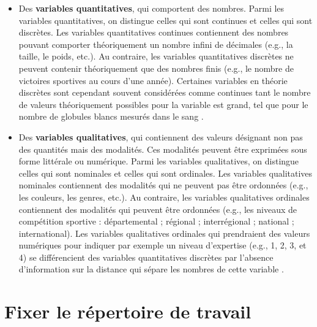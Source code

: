 \documentclass[
  french,
]{book}
\providecommand{\tightlist}{%
  \setlength{\itemsep}{0pt}\setlength{\parskip}{0pt}}
\begin{document}
\begin{itemize}
\tightlist
\item
  Des \textbf{variables quantitatives}, qui comportent des nombres. Parmi les variables quantitatives, on distingue celles qui sont continues et celles qui sont discrètes. Les variables quantitatives continues contiennent des nombres pouvant comporter théoriquement un nombre infini de décimales (e.g., la taille, le poids, etc.). Au contraire, les variables quantitatives discrètes ne peuvent contenir théoriquement que des nombres finis (e.g., le nombre de victoires sportives au cours d'une année). Certaines variables en théorie discrètes sont cependant souvent considérées comme continues tant le nombre de valeurs théoriquement possibles pour la variable est grand, tel que pour le nombre de globules blancs mesurés dans le sang \autocite{labreucheDifferentsTypesVariables2010}.
\item
  Des \textbf{variables qualitatives}, qui contiennent des valeurs désignant non pas des quantités mais des modalités. Ces modalités peuvent être exprimées sous forme littérale ou numérique. Parmi les variables qualitatives, on distingue celles qui sont nominales et celles qui sont ordinales. Les variables qualitatives nominales contiennent des modalités qui ne peuvent pas être ordonnées (e.g., les couleurs, les genres, etc.). Au contraire, les variables qualitatives ordinales contiennent des modalités qui peuvent être ordonnées (e.g., les niveaux de compétition sportive : départemental ; régional ; interrégional ; national ; international). Les variables qualitatives ordinales qui prendraient des valeurs numériques pour indiquer par exemple un niveau d'expertise (e.g., 1, 2, 3, et 4) se différencient des variables quantitatives discrètes par l'absence d'information sur la distance qui sépare les nombres de cette variable \autocite{labreucheDifferentsTypesVariables2010}.
\end{itemize}

\hypertarget{fixer-le-ruxe9pertoire-de-travail}{%
\section{Fixer le répertoire de travail}\label{fixer-le-ruxe9pertoire-de-travail}}
\end{document}
